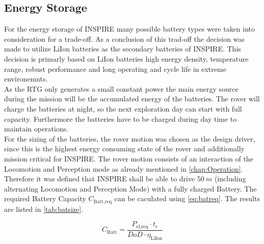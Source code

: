 \subsection{Energy Storage} 
For the energy storage of INSPIRE many possible battery types were taken into consideration for a trade-off. As a conclusion of this trad-off the decision was made to utilize LiIon batteries as the secondary batteries of INSPIRE. This decision is primarly based on LiIon batteries high energy density, temperature range, robust performance and long operating and cycle life in extreme environemnts. \\
As the RTG only generates a small constant power the main energy source during the mission will be the accumulated energy of the batteries. The rover will charge the batteries at night, so the next exploration day can start with full capacity. Furthermore the batteries have to be charged during day time to maintain operations.\\

For the sizing of the batteries, the rover motion was chosen as the design driver, since this is the highest energy consuming state of the rover and additionally mission critical for INSPIRE. The rover motion consists of an interaction of the Locomotion and Perception mode as already mentioned in \autoref{chap:Operation}. Therefore it was defined that INSPIRE shall be able to drive $ 50 \ m $ (including alternating Locomotion and Perception Mode) with a fully charged Battery. The required Battery Capacity $C_\text{Batt,req}$ can be caculated using \autoref{eq:batreq}. The results are listed in \autoref{tab:batsize}.


\begin{equation}
C_\text{Batt} = \frac{P_\text{el,req} \cdot t_e }{DoD \cdot \eta_\text{LiIon}}
\label{eq:batreq}
\end{equation}

